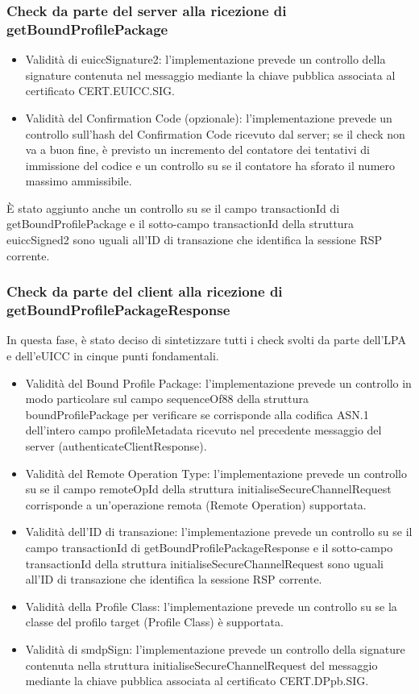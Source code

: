 \documentclass[10pt, oneside]{book}
\begin{document}
\subsubsection{Check da parte del server alla ricezione di getBoundProfilePackage}
\begin{itemize}
\item Validità di euiccSignature2: l'implementazione prevede un controllo della signature contenuta nel messaggio mediante la chiave pubblica associata al certificato CERT.EUICC.SIG.
\item Validità del Confirmation Code (opzionale): l'implementazione prevede un controllo sull'hash del Confirmation Code ricevuto dal server; se il check non va a buon fine, è previsto un incremento del contatore dei tentativi di immissione del codice e un controllo su se il contatore ha sforato il numero massimo ammissibile.
\end{itemize}
È stato aggiunto anche un controllo su se il campo transactionId di getBoundProfilePackage e il sotto-campo transactionId della struttura euiccSigned2 sono uguali all'ID di transazione che identifica la sessione RSP corrente.

\subsubsection{Check da parte del client alla ricezione di getBoundProfilePackageResponse}
In questa fase, è stato deciso di sintetizzare tutti i check svolti da parte dell'LPA e dell'eUICC in cinque punti fondamentali.
\begin{itemize}
\item Validità del Bound Profile Package: l'implementazione prevede un controllo in modo particolare sul campo sequenceOf88 della struttura boundProfilePackage per verificare se corrisponde alla codifica ASN.1 dell'intero campo profileMetadata ricevuto nel precedente messaggio del server (authenticateClientResponse).
\item Validità del Remote Operation Type: l'implementazione prevede un controllo su se il campo remoteOpId della struttura initialiseSecureChannelRequest corrisponde a un'operazione remota (Remote Operation) supportata.
\item Validità dell'ID di transazione: l'implementazione prevede un controllo su se il campo transactionId di getBoundProfilePackageResponse e il sotto-campo transactionId della struttura initialiseSecureChannelRequest sono uguali all'ID di transazione che identifica la sessione RSP corrente.
\item Validità della Profile Class: l'implementazione prevede un controllo su se la classe del profilo target (Profile Class) è supportata.
\item Validità di smdpSign: l'implementazione prevede un controllo della signature contenuta nella struttura initialiseSecureChannelRequest del messaggio mediante la chiave pubblica associata al certificato CERT.DPpb.SIG.
\end{itemize}
\end{document}
